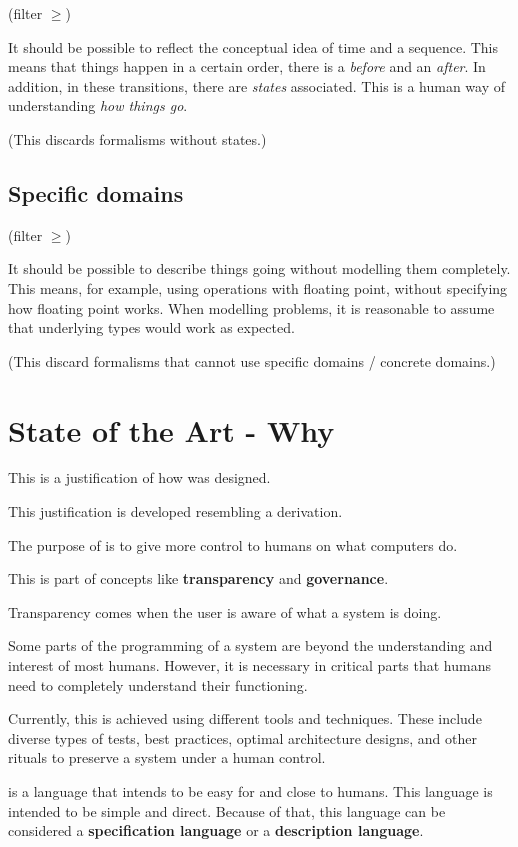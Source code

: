 (filter $\geq $)

It should be possible to reflect the conceptual idea of time and a sequence.
This means that things happen in a certain order, there is a \textit{before} and an \textit{after}.
In addition, in these transitions, there are \textit{states} associated.
This is a human way of understanding \textit{how things go}.

(This discards formalisms without states.)

\subsection{Specific domains}

(filter $\geq $)

It should be possible to describe things going without modelling them completely.
This means, for example, using operations with floating point, without specifying how floating point works.
When modelling problems, it is reasonable to assume that underlying types would work as expected.

(This discard formalisms that cannot use specific domains / concrete domains.)


\section{State of the Art - Why \Soda}

This is a justification of how \Soda was designed.

This justification is developed resembling a derivation.

The purpose of \Soda is to give more control to humans on what computers do.

This is part of concepts like \textbf{transparency} and \textbf{governance}.

Transparency comes when the user is aware of what a system is doing.

Some parts of the programming of a system are beyond the understanding and interest of most humans.
However, it is necessary in critical parts that humans need to completely understand their functioning.

Currently, this is achieved using different tools and techniques.
These include diverse types of tests, best practices, optimal architecture designs, and other rituals to preserve a system under a human control.

\Soda is a language that intends to be easy for and close to humans.
This language is intended to be simple and direct.
Because of that, this language can be considered a \textbf{specification language} or a \textbf{description language}.

